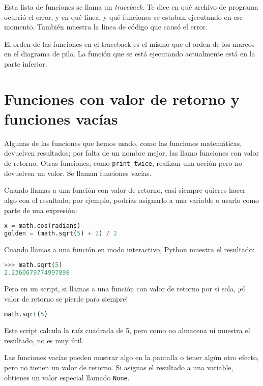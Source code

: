 Esta lista de funciones se llama un \textit{traceback}. Te dice en qué archivo de programa ocurrió el error, y en qué línea, y qué funciones se estaban ejecutando en ese momento. También muestra la línea de código que causó el error.

El orden de las funciones en el traceback es el mismo que el orden de los marcos en el diagrama de pila. La función que se está ejecutando actualmente está en la parte inferior.

\section{Funciones con valor de retorno y funciones vacías}

Algunas de las funciones que hemos usado, como las funciones matemáticas, devuelven resultados; por falta de un nombre mejor, las llamo funciones con valor de retorno. Otras funciones, como \texttt{print\_twice}, realizan una acción pero no devuelven un valor. Se llaman funciones vacías.

Cuando llamas a una función con valor de retorno, casi siempre quieres hacer algo con el resultado; por ejemplo, podrías asignarlo a una variable o usarlo como parte de una expresión:

\begin{lstlisting}[language=Python]
x = math.cos(radians)
golden = (math.sqrt(5) + 1) / 2
\end{lstlisting}

Cuando llamas a una función en modo interactivo, Python muestra el resultado:

\begin{lstlisting}[language=Python]
>>> math.sqrt(5)
2.2360679774997898
\end{lstlisting}

Pero en un script, si llamas a una función con valor de retorno por sí sola, ¡el valor de retorno se pierde para siempre!

\begin{lstlisting}[language=Python]
math.sqrt(5)
\end{lstlisting}

Este script calcula la raíz cuadrada de 5, pero como no almacena ni muestra el resultado, no es muy útil.

Las funciones vacías pueden mostrar algo en la pantalla o tener algún otro efecto, pero no tienen un valor de retorno. Si asignas el resultado a una variable, obtienes un valor especial llamado \texttt{None}.

